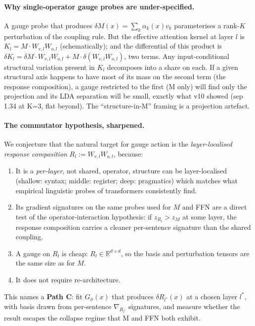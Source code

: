 \documentclass[11pt, a4paper]{article}
\theoremstyle{plain}
\theoremstyle{definition}
\theoremstyle{remark}
\begin{document}
\paragraph{Why single-operator gauge probes are under-specified.}
A gauge probe that produces $\delta M(x) = \sum_k \alpha_k(x) v_k$ parameterises a rank-$K$ perturbation of the coupling rule.
But the effective attention kernel at layer $l$ is $K_l = M \cdot W_{v,l} W_{o,l}$ (schematically); and the differential of this product is $\delta K_l = \delta M \cdot W_{v,l} W_{o,l} + M \cdot \delta(W_{v,l} W_{o,l})$, two terms.
Any input-conditional structural variation present in $K_l$ decomposes into a share on each.
If a given structural axis happens to have most of its mass on the second term (the response composition), a gauge restricted to the first (M only) will find only the projection and its LDA separation will be small, exactly what v10 showed (sep 1.34 at K=3, flat beyond).
The ``structure-in-M'' framing is a projection artefact.

\paragraph{The commutator hypothesis, sharpened.}
We conjecture that the natural target for gauge action is the \emph{layer-localised response composition} $R_l := W_{v,l} W_{o,l}$, because:
\begin{enumerate}[nosep,leftmargin=2em]
\item It is a \emph{per-layer}, not shared, operator, structure can be layer-localised (shallow: syntax; middle: register; deep: pragmatics) which matches what empirical linguistic probes of transformers consistently find.
\item Its gradient signatures on the same probes used for $M$ and FFN are a direct test of the operator-interaction hypothesis: if $z_{R_l} > z_M$ at some layer, the response composition carries a cleaner per-sentence signature than the shared coupling.
\item A gauge on $R_l$ is cheap: $R_l \in \mathbb{R}^{d \times d}$, so the basis and perturbation tensors are the same size as for $M$.
\item It does not require re-architecture.
\end{enumerate}

This names a \textbf{Path C}: fit $G_\phi(x)$ that produces $\delta R_{l^*}(x)$ at a chosen layer $l^*$, with basis drawn from per-sentence $\nabla_{R_{l^*}}$ signatures, and measure whether the result escapes the collapse regime that M and FFN both exhibit.
\end{document}
